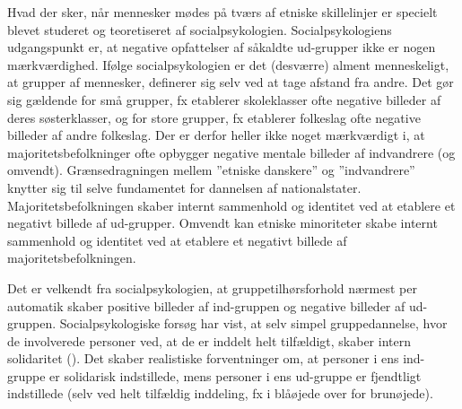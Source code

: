 \documentclass[
]{book}
\begin{document}
Hvad der sker, når mennesker mødes på tværs af etniske skillelinjer er specielt blevet studeret og teoretiseret af socialpsykologien. Socialpsykologiens udgangspunkt er, at negative opfattelser af såkaldte ud-grupper ikke er nogen mærkværdighed. Ifølge socialpsykologien er det (desværre) alment menneskeligt, at grupper af mennesker, definerer sig selv ved at tage afstand fra andre. Det gør sig gældende for små grupper, fx etablerer skoleklasser ofte negative billeder af deres søsterklasser, og for store grupper, fx etablerer folkeslag ofte negative billeder af andre folkeslag. Der er derfor heller ikke noget mærkværdigt i, at majoritetsbefolkninger ofte opbygger negative mentale billeder af indvandrere (og omvendt). Grænsedragningen mellem ''etniske danskere'' og ''indvandrere'' knytter sig til selve fundamentet for dannelsen af nationalstater. Majoritetsbefolkningen skaber internt sammenhold og identitet ved at etablere et negativt billede af ud-grupper. Omvendt kan etniske minoriteter skabe internt sammenhold og identitet ved at etablere et negativt billede af majoritetsbefolkningen.

Det er velkendt fra socialpsykologien, at gruppetilhørsforhold nærmest per automatik skaber positive billeder af ind-gruppen og negative billeder af ud-gruppen. Socialpsykologiske forsøg har vist, at selv simpel gruppedannelse, hvor de involverede personer ved, at de er inddelt helt tilfældigt, skaber intern solidaritet (). Det skaber realistiske forventninger om, at personer i ens ind-gruppe er solidarisk indstillede, mens personer i ens ud-gruppe er fjendtligt indstillede (selv ved helt tilfældig inddeling, fx i blåøjede over for brunøjede).
\end{document}
